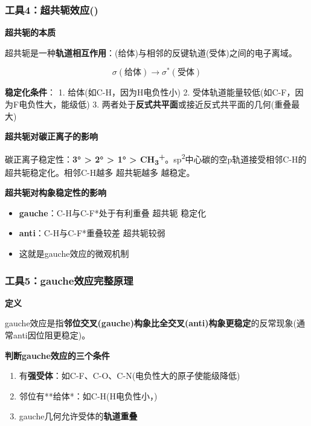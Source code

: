 \subsubsection{\texorpdfstring{工具4：超共轭效应(\箭)}{工具4：超共轭效应(*)}}\label{ux5de5ux51774ux8d85ux5171ux8f6dux6548ux5e94}

\textbf{超共轭的本质}

超共轭是一种\textbf{轨道相互作用}：(给体)与相邻的反键轨道(受体)之间的电子离域。

\[\sigma(\text{给体}) \rightarrow \sigma^*(\text{受体})\]

\textbf{稳定化条件}：
1. 给体(如C-H，因为H电负性小)
2. 受体轨道能量较低(如C-F，因为F电负性大，能级低)
3. 两者处于\textbf{反式共平面}或接近反式共平面的几何(重叠最大)

\textbf{超共轭对碳正离子的影响}

碳正离子稳定性：\textbf{3° \textgreater{} 2° \textgreater{} 1° \textgreater{} CH\textsubscript{3}\textsuperscript{+}}。sp\textsuperscript{2}中心碳的空p轨道接受相邻C-H的 \箭 超共轭稳定化。相邻C-H越多 \箭 超共轭越多 \箭 越稳定。

\textbf{超共轭对构象稳定性的影响}

\begin{itemize}
\tightlist
\item
  \textbf{gauche}：C-H与C-F*处于有利重叠 \箭 超共轭 \箭 稳定化
\item
  \textbf{anti}：C-H与C-F*重叠较差 \箭 超共轭较弱
\item
  这就是gauche效应的微观机制
\end{itemize}

\subsubsection{工具5：gauche效应完整原理}\label{ux5de5ux51775gaucheux6548ux5e94ux5b8cux6574ux539fux7406}

\textbf{定义}

gauche效应是指\textbf{邻位交叉(gauche)构象比全交叉(anti)构象更稳定}的反常现象(通常anti因位阻更稳定)。

\textbf{判断gauche效应的三个条件}

\begin{enumerate}
\def\labelenumi{\arabic{enumi}.}
\tightlist
\item
  有\textbf{强受体}：如C-F、C-O、C-N(电负性大的原子使能级降低)
\item
  邻位有**给体*：如C-H(H电负性小，)
\item
  gauche几何允许受体的\textbf{轨道重叠}
\end{enumerate}

